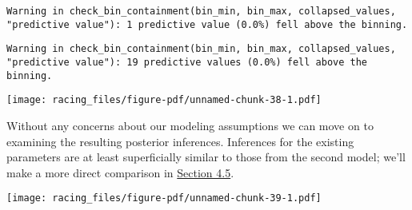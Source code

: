 \documentclass[
  letterpaper,
  DIV=11,
  numbers=noendperiod]{scrartcl}
\newenvironment{Shaded}{\begin{snugshade}}{\end{snugshade}}
\newcommand{\AttributeTok}[1]{\textcolor[rgb]{0.40,0.45,0.13}{#1}}
\newcommand{\DecValTok}[1]{\textcolor[rgb]{0.68,0.00,0.00}{#1}}
\newcommand{\FunctionTok}[1]{\textcolor[rgb]{0.28,0.35,0.67}{#1}}
\newcommand{\NormalTok}[1]{\textcolor[rgb]{0.00,0.23,0.31}{#1}}
\newcommand{\SpecialCharTok}[1]{\textcolor[rgb]{0.37,0.37,0.37}{#1}}
\newcommand{\StringTok}[1]{\textcolor[rgb]{0.13,0.47,0.30}{#1}}
\begin{document}
\begin{verbatim}
Warning in check_bin_containment(bin_min, bin_max, collapsed_values,
"predictive value"): 1 predictive value (0.0%) fell above the binning.
\end{verbatim}

\begin{verbatim}
Warning in check_bin_containment(bin_min, bin_max, collapsed_values,
"predictive value"): 19 predictive values (0.0%) fell above the binning.
\end{verbatim}

\texttt{[image: racing\_files/figure-pdf/unnamed-chunk-38-1.pdf]}

Without any concerns about our modeling assumptions we can move on to
examining the resulting posterior inferences. Inferences for the
existing parameters are at least superficially similar to those from the
second model; we'll make a more direct comparison in
\hyperref[sec:inf-comp]{Section 4.5}.

\begin{Shaded}
\end{Shaded}

\texttt{[image: racing\_files/figure-pdf/unnamed-chunk-39-1.pdf]}
\end{document}
